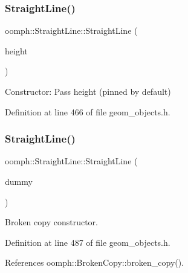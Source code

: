 \subsubsection{\texorpdfstring{Straight\+Line()}{StraightLine()}\hspace{0.1cm}{\footnotesize\ttfamily [2/3]}}
{\footnotesize\ttfamily oomph\+::\+Straight\+Line\+::\+Straight\+Line (\begin{DoxyParamCaption}\item[{const double \&}]{height }\end{DoxyParamCaption})\hspace{0.3cm}{\ttfamily [inline]}}



Constructor\+: Pass height (pinned by default) 



Definition at line 466 of file geom\+\_\+objects.\+h.

\mbox{\label{classoomph_1_1StraightLine_a89b03f4db2dbd72aba9504b4046f9594}} 
\subsubsection{\texorpdfstring{Straight\+Line()}{StraightLine()}\hspace{0.1cm}{\footnotesize\ttfamily [3/3]}}
{\footnotesize\ttfamily oomph\+::\+Straight\+Line\+::\+Straight\+Line (\begin{DoxyParamCaption}\item[{const \hyperlink{classoomph_1_1StraightLine}{Straight\+Line} \&}]{dummy }\end{DoxyParamCaption})\hspace{0.3cm}{\ttfamily [inline]}}



Broken copy constructor. 



Definition at line 487 of file geom\+\_\+objects.\+h.



References oomph\+::\+Broken\+Copy\+::broken\+\_\+copy().

\mbox{\label{classoomph_1_1StraightLine_a767d33f859268e751729e69f18a559a9}} 
